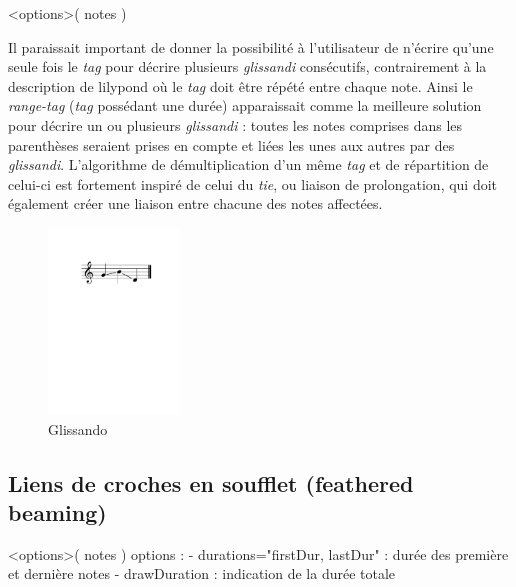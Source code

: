 \documentclass{article}
\newenvironment{gmncode}	{\vspace{-2mm}\small\verbatim}{\endverbatim\vspace{-2mm}}
\begin{document}
\begin{gmncode}
\glissando<options>( notes )
\end{gmncode}

Il paraissait important de donner la possibilité à l'utilisateur de n'écrire qu'une seule fois le \emph{tag} pour décrire plusieurs \emph{glissandi} consécutifs, contrairement à la description de lilypond où le \emph{tag} doit être répété entre chaque note. Ainsi le \emph{range-tag} (\emph{tag} possédant une durée) apparaissait comme la meilleure solution pour décrire un ou plusieurs \emph{glissandi} : toutes les notes comprises dans les parenthèses seraient prises en compte et liées les unes aux autres par des \emph{glissandi}. L'algorithme de démultiplication d'un même \emph{tag} et de répartition de celui-ci est fortement inspiré de celui du \emph{tie}, ou liaison de prolongation, qui doit également créer une liaison entre chacune des notes affectées.
\\

\begin{figure}[h]
\centering

\begin{gmncode}
[ \glissando( g b d ) ]
\end{gmncode}

\includegraphics[width=35mm]{img/glissando1.pdf}
\caption{Glissando}
\label{fig:glissandoSimple}
\end{figure}




\subsection{Liens de croches en soufflet (feathered beaming)}
\bigskip

\begin{gmncode}
\fBeam<options>( notes )
  options : 
    - durations="firstDur, lastDur" : 
      durée des première et dernière notes
    - drawDuration : 
      indication de la durée totale

\end{gmncode}
\end{document}
